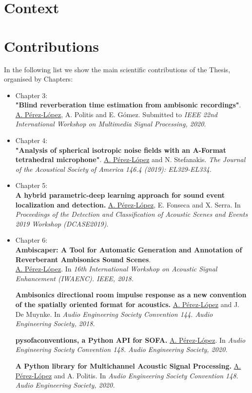 \section{Context}
\label{sec:context}



\section{Contributions}


In the following list we show the main scientific contributions of the Thesis, organised by Chapters:

\begin{itemize}

	\item Chapter 3:\\
	\textbf{"Blind reverberation time estimation from ambisonic recordings"}.
	\underline{A. P\'erez-L\'opez}, A. Politis and E. G\'omez.
	Submitted to \textit{IEEE 22nd International Workshop on Multimedia Signal Processing, 2020.}
	
	\item Chapter 4:\\
	\textbf{"Analysis of spherical isotropic noise fields with an A-Format tetrahedral microphone"}.
	\underline{A. P\'erez-L\'opez} and N. Stefanakis.
	\textit{The Journal of the Acoustical Society of America 146.4 (2019): EL329-EL334.}

	\item Chapter 5:\\
	\textbf{A hybrid parametric-deep learning approach for sound event localization and detection.}
	\underline{A. P\'erez-L\'opez}, E. Fonseca and X. Serra.
	In \textit{Proceedings of the Detection and Classification of Acoustic Scenes and Events 2019 Workshop (DCASE2019)}.
	
	
	\item Chapter 6:\\
	\textbf{Ambiscaper: A Tool for Automatic Generation and Annotation of Reverberant Ambisonics Sound Scenes}.\\
	\underline{A. P\'erez-L\'opez}.
	In \textit{16th International Workshop on Acoustic Signal Enhancement (IWAENC). IEEE, 2018.}
	
	\textbf{Ambisonics directional room impulse response as a new convention of the spatially oriented format for acoustics.}
	\underline{A. P\'erez-L\'opez} and J. De Muynke.
	In \textit{Audio Engineering Society Convention 144. Audio Engineering Society, 2018.}
	
	\textbf{pysofaconventions, a Python API for SOFA.}
	\underline{A. P\'erez-L\'opez}.
	In \textit{Audio Engineering Society Convention 148. Audio Engineering Society, 2020.}
	
	\textbf{A Python library for Multichannel Acoustic Signal Processing.}
	\underline{A. P\'erez-L\'opez} and A. Politis.
	In \textit{Audio Engineering Society Convention 148. Audio Engineering Society, 2020.}
	
\end{itemize}


